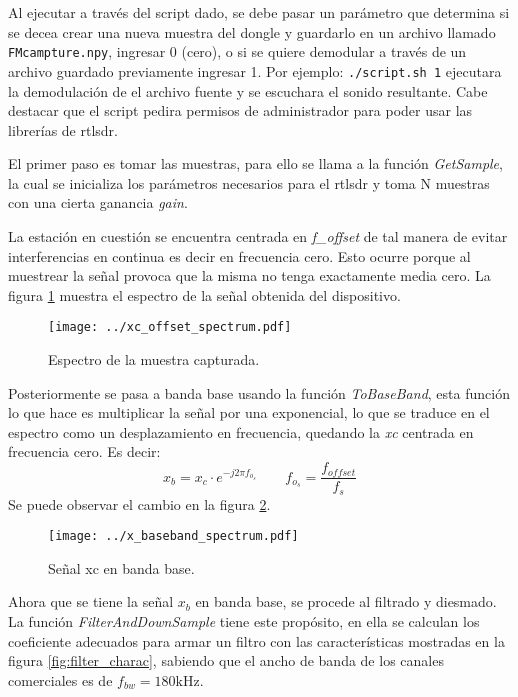 Al ejecutar a través del script dado, se debe pasar un parámetro que determina si se decea crear una nueva muestra del dongle y guardarlo en un archivo llamado \texttt{FMcampture.npy}, ingresar 0 (cero), o si se quiere demodular a través de un archivo guardado previamente ingresar 1.
Por ejemplo: \texttt{./script.sh 1} ejecutara la demodulación de el archivo fuente y se escuchara el sonido resultante. Cabe destacar que el script pedira permisos de administrador para poder usar las librerías de rtlsdr.

El primer paso es tomar las muestras, para ello se llama a la función \emph{GetSample}, la cual se inicializa los parámetros necesarios para el rtlsdr y toma N muestras con una cierta ganancia \emph{gain}.

La estación en cuestión se encuentra centrada en \emph{f\_offset} de tal manera de evitar interferencias en continua es decir en frecuencia cero. Esto ocurre porque al muestrear la señal provoca que la misma no tenga exactamente media cero. 
La figura \ref{fig:xc_offset_spectrum} muestra el espectro de la señal obtenida del dispositivo.
\begin{figure}[ht!]
	\centering
	\texttt{[image: ../xc\_offset\_spectrum.pdf]}
	\caption{Espectro de la muestra capturada.}
	\label{fig:xc_offset_spectrum}
\end{figure}

Posteriormente se pasa a banda base usando la función \emph{ToBaseBand}, esta función lo que hace es multiplicar la señal por una exponencial, lo que se traduce en el espectro como un desplazamiento en frecuencia, quedando la \emph{xc} centrada en frecuencia cero. Es decir:
$$
	x_b = x_c \cdot e^{-j 2 \pi f_{o_s}} \quad \quad f_{o_s} = \frac{f_{offset}}{f_s}
$$
Se puede observar el cambio en la figura \ref{fig:x_baseband_spectrum}.
\begin{figure}[ht!]
	\centering
	\texttt{[image: ../x\_baseband\_spectrum.pdf]}
	\caption{Señal xc en banda base.}
	\label{fig:x_baseband_spectrum}
\end{figure}

Ahora que se tiene la señal $x_b$ en banda base, se procede al filtrado y diesmado.
La función \emph{FilterAndDownSample} tiene este propósito, en ella se calculan los coeficiente adecuados para armar un filtro con las características mostradas en la figura \ref{fig:filter_charac}, sabiendo que el ancho de banda de los canales comerciales es de $f_{bw} = 180 \mbox{kHz}$.

